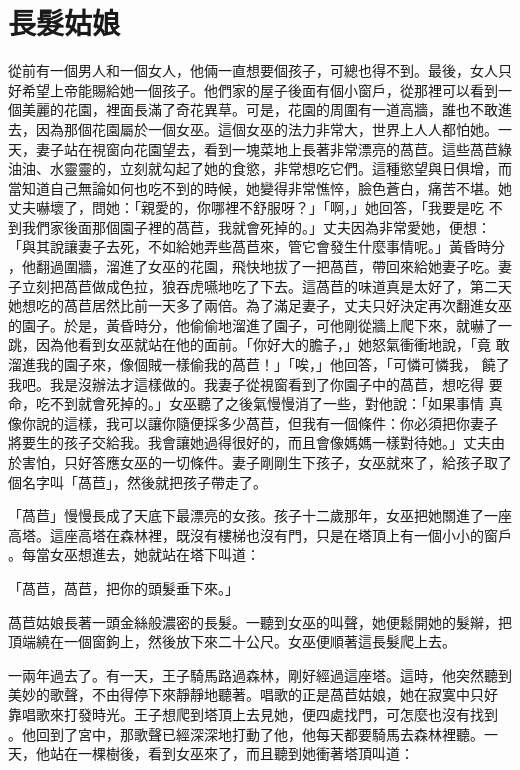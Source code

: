 \documentclass[oneside,10pt]{memoir} %
\begin{document}

\chapter{長髮姑娘}

從前有一個男人和一個女人，他倆一直想要個孩子，可總也得不到。最後，女人只
好希望上帝能賜給她一個孩子。他們家的屋子後面有個小窗戶，從那裡可以看到一
個美麗的花園，裡面長滿了奇花異草。可是，花園的周圍有一道高牆，誰也不敢進
去，因為那個花園屬於一個女巫。這個女巫的法力非常大，世界上人人都怕她。一
天，妻子站在視窗向花園望去，看到一塊菜地上長著非常漂亮的萵苣。這些萵苣綠
油油、水靈靈的，立刻就勾起了她的食慾，非常想吃它們。這種慾望與日俱增，而
當知道自己無論如何也吃不到的時候，她變得非常憔悴，臉色蒼白，痛苦不堪。她
丈夫嚇壞了，問她：「親愛的，你哪裡不舒服呀？」「啊，」她回答，「我要是吃
不到我們家後面那個園子裡的萵苣，我就會死掉的。」丈夫因為非常愛她，便想：
「與其說讓妻子去死，不如給她弄些萵苣來，管它會發生什麼事情呢。」黃昏時分
，他翻過圍牆，溜進了女巫的花園，飛快地拔了一把萵苣，帶回來給她妻子吃。妻
子立刻把萵苣做成色拉，狼吞虎嚥地吃了下去。這萵苣的味道真是太好了，第二天
她想吃的萵苣居然比前一天多了兩倍。為了滿足妻子，丈夫只好決定再次翻進女巫
的園子。於是，黃昏時分，他偷偷地溜進了園子，可他剛從牆上爬下來，就嚇了一
跳，因為他看到女巫就站在他的面前。「你好大的膽子，」她怒氣衝衝地說，「竟
敢溜進我的園子來，像個賊一樣偷我的萵苣！」「唉，」他回答，「可憐可憐我，
饒了我吧。我是沒辦法才這樣做的。我妻子從視窗看到了你園子中的萵苣，想吃得
要命，吃不到就會死掉的。」女巫聽了之後氣慢慢消了一些，對他說：「如果事情
真像你說的這樣，我可以讓你隨便採多少萵苣，但我有一個條件：你必須把你妻子
將要生的孩子交給我。我會讓她過得很好的，而且會像媽媽一樣對待她。」丈夫由
於害怕，只好答應女巫的一切條件。妻子剛剛生下孩子，女巫就來了，給孩子取了
個名字叫「萵苣」，然後就把孩子帶走了。

「萵苣」慢慢長成了天底下最漂亮的女孩。孩子十二歲那年，女巫把她關進了一座
高塔。這座高塔在森林裡，既沒有樓梯也沒有門，只是在塔頂上有一個小小的窗戶
。每當女巫想進去，她就站在塔下叫道：

「萵苣，萵苣，把你的頭髮垂下來。」

萵苣姑娘長著一頭金絲般濃密的長髮。一聽到女巫的叫聲，她便鬆開她的髮辮，把
頂端繞在一個窗鉤上，然後放下來二十公尺。女巫便順著這長髮爬上去。

一兩年過去了。有一天，王子騎馬路過森林，剛好經過這座塔。這時，他突然聽到
美妙的歌聲，不由得停下來靜靜地聽著。唱歌的正是萵苣姑娘，她在寂寞中只好
靠唱歌來打發時光。王子想爬到塔頂上去見她，便四處找門，可怎麼也沒有找到
。他回到了宮中，那歌聲已經深深地打動了他，他每天都要騎馬去森林裡聽。一
天，他站在一棵樹後，看到女巫來了，而且聽到她衝著塔頂叫道：
\end{document}
